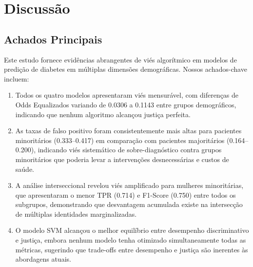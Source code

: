 
\section{Discussão}

\subsection{Achados Principais}

Este estudo fornece evidências abrangentes de viés algorítmico em modelos 
de predição de diabetes em múltiplas dimensões demográficas. Nossos 
achados-chave incluem:

\begin{enumerate}[leftmargin=*]
    \item Todos os quatro modelos apresentaram viés mensurável, com 
          diferenças de Odds Equalizados variando de 0.0306 a 0.1143 entre 
          grupos demográficos, indicando que nenhum algoritmo alcançou 
          justiça perfeita.
    \item As taxas de falso positivo foram consistentemente mais altas para 
          pacientes minoritários (0.333--0.417) em comparação com pacientes 
          majoritários (0.164--0.200), indicando viés sistemático de 
          sobre-diagnóstico contra grupos minoritários que poderia levar 
          a intervenções desnecessárias e custos de saúde.
    \item A análise interseccional revelou viés amplificado para mulheres 
          minoritárias, que apresentaram o menor TPR (0.714) e F1-Score 
          (0.750) entre todos os subgrupos, demonstrando que desvantagem 
          acumulada existe na intersecção de múltiplas identidades 
          marginalizadas.
    \item O modelo SVM alcançou o melhor equilíbrio entre desempenho 
          discriminativo e justiça, embora nenhum modelo tenha otimizado 
          simultaneamente todas as métricas, sugerindo que trade-offs entre 
          desempenho e justiça são inerentes às abordagens atuais.
\end{enumerate}

